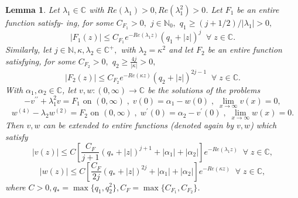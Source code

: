 \documentclass[12pt]{article}
\newtheorem{lemma}[theorem]{Lemma}
\begin{document}
\begin{lemma}
\label{lemma_aux0} Let $\lambda_1 \in \mathbb{C}$ with $Re(\lambda_1)>0,Re(\lambda_1^{2})>0$. Let $F_1$ be an entire function satisfy- ing, for some $%
C_{F_1}>0,$ $j\in \mathbb{N}_{0},$ $q_1\geq (j+1/2)/|\lambda_1|>0,$ 
\begin{equation*}
\left\vert F_1(z)\right\vert \leq C_{F_1}e^{-Re(\lambda_1 z)}\left( q_1+\left\vert
z\right\vert \right) ^{j} \; \; \forall \; z\in \mathbb{C}.
\end{equation*}%
Similarly, let $j\in \mathbb{N}, \kappa, \lambda_2 \in \mathbb{C}^{+},$ with $\lambda_2 = \kappa^2$ and let $F_2$ be an entire function satisfying, for some $C_{F_2}>0,$ $q_2\geq \frac{4j}{|\kappa|}>0,$
\begin{equation*}
\left\vert F_2(z)\right\vert \leq C_{F_2}e^{-Re(\kappa z)}\left( q_2+\left\vert
z\right\vert \right) ^{2j-1} \; \; \forall \; z\in \mathbb{C}.
\end{equation*}%
With $\alpha_1, \alpha_2 \in \mathbb{C}$, let $v,w:(0,\infty )\rightarrow \mathbb{C}$ be the solutions of the problems
%
\begin{equation*}
-v^{\prime \prime }+\lambda_1^{2}v=F_1\text{ on }(0,\infty
) \; , \; v(0)=\alpha_1 - w(0) \; , \; \lim_{x\rightarrow \infty }v(x)=0,
\end{equation*}%
\begin{equation*}
w^{(4)}-\lambda_2 w^{(2)}=F_2\text{ on }(0,\infty ) \; , \; w^{\prime }(0)=\alpha_2 - v^{\prime }(0) \; , \; \lim_{x\rightarrow \infty}w(x)=0.
\end{equation*}%
Then $v,w$ can be extended to entire functions (denoted again by $v,w$) which satisfy
\begin{equation*}
\left\vert v(z)\right\vert \leq C \left[ \frac{C_{F}}{j+1}\left(
q_*+\left\vert z\right\vert \right) ^{j+1}+\left\vert \alpha_1 \right\vert+\left\vert \alpha_2 \right\vert \right] e^{-Re(\lambda_1 z)} \; \; \forall \; z\in \mathbb{C},
\end{equation*}%
\begin{equation*}
\left\vert w(z)\right\vert \leq C \left[ \frac{C_{F}}{2j}\left( q_*+\left\vert z\right\vert \right) ^{2j}+\left\vert \alpha_1 \right\vert+\left\vert \alpha_2 \right\vert \right] e^{-Re(\kappa z)} \; \; \forall \; z\in \mathbb{C},
\end{equation*}%
where $C>0,q_* = \max \{q_1,q_2^2 \},C_F = \max \{C_{F_1},C_{F_2} \}$.
\end{lemma}
\end{document}
